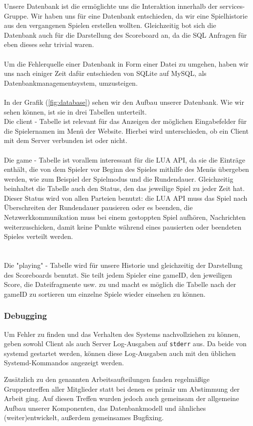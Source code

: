 Unsere Datenbank ist die ermöglichte uns die Interaktion innerhalb der services-Gruppe. Wir haben uns für eine Datenbank entschieden, da wir eine Spielhistorie aus den vergangenen Spielen erstellen wollten. Gleichzeitig bot sich die Datenbank auch für die Darstellung des Scoreboard an, da die SQL Anfragen für eben dieses sehr trivial waren.\\\\
Um die Fehlerquelle einer Datenbank in Form einer Datei zu umgehen, haben wir uns nach einiger Zeit dafür entschieden von SQLite auf MySQL, als Datenbankmanagementsystem, umzusteigen.\\\\

In der Grafik (\cref{fig:database}) sehen wir den Aufbau unserer Datenbank. Wie wir sehen können, ist sie in drei Tabellen unterteilt.\\
Die client - Tabelle ist relevant für das Anzeigen der möglichen Eingabefelder für die Spielernamen im Menü der Website. Hierbei wird unterschieden, ob ein Client mit dem Server verbunden ist oder nicht.\\\\
Die game - Tabelle ist vorallem interessant für die LUA API, da sie die Einträge enthält, die von dem Spieler vor Beginn des Spieles mithilfe des Menüs übergeben werden, wie zum Beispiel der Spielmodus und die Rundendauer. Gleichzeitig beinhaltet die Tabelle auch den Status, den das jeweilige Spiel zu jeder Zeit hat. Dieser Status wird von allen Parteien benutzt: die LUA API muss das Spiel nach Überschreiten der Rundendauer pausieren oder es beenden, die Netzwerkkommunikation muss bei einem gestoppten Spiel aufhören, Nachrichten weiterzuschicken, damit keine Punkte während eines pausierten oder beendeten Spieles verteilt werden.\\\\\\
Die "playing" - Tabelle wird für unsere Historie und gleichzeitig der Darstellung des Scoreboards benutzt. Sie teilt jedem Spieler eine gameID, den jeweiligen Score, die Dateifragmente usw. zu und macht es möglich die Tabelle nach der gameID zu sortieren um einzelne Spiele wieder einsehen zu können.

\subsubsection{Debugging}

Um Fehler zu finden und das Verhalten des Systems nachvollziehen zu können, geben sowohl Client als auch Server Log-Ausgaben auf \texttt{stderr} aus. Da beide von systemd gestartet werden, können diese Log-Ausgaben auch mit den üblichen Systemd-Kommandos angezeigt werden.\newline

Zusätzlich zu den genannten Arbeitsaufteilungen fanden regelmäßige Gruppentreffen aller Mitglieder statt bei denen es primär um Abstimmung der Arbeit ging. Auf diesen Treffen wurden jedoch auch gemeinsam der allgemeine Aufbau unserer Komponenten, das Datenbankmodell und ähnliches (weiter)entwickelt, außerdem gemeinsames Bugfixing.

